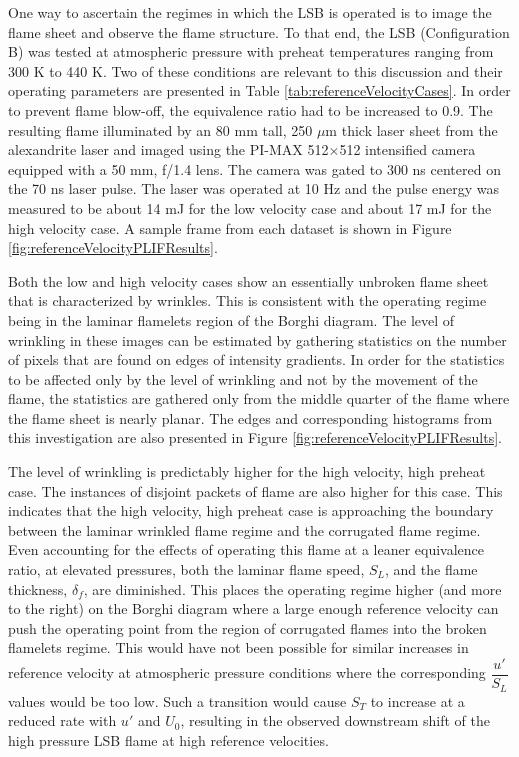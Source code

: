One way to ascertain the regimes in which the LSB is operated is to image the flame sheet and observe the flame structure.
To that end, the LSB (Configuration B) was tested at atmospheric pressure with preheat temperatures ranging from 300 K to 440 K.
Two of these conditions are relevant to this discussion and their operating parameters are presented in Table \ref{tab:referenceVelocityCases}.
In order to prevent flame blow-off, the equivalence ratio had to be increased to 0.9.
The resulting flame illuminated by an 80 mm tall, 250 \(\mu\)m thick laser sheet from the alexandrite laser and imaged using the PI-MAX 512\(\times\)512 intensified camera equipped with a 50 mm, f/1.4 lens.
The camera was gated to 300 ns centered on the 70 ns laser pulse.
The laser was operated at 10 Hz and the pulse energy was measured to be about 14 mJ for the low velocity case and about 17 mJ for the high velocity case.
A sample frame from each dataset is shown in Figure \ref{fig:referenceVelocityPLIFResults}. 

Both the low and high velocity cases show an essentially unbroken flame sheet that is characterized by wrinkles.
This is consistent with the operating regime being in the laminar flamelets region of the Borghi diagram.
The level of wrinkling in these images can be estimated by gathering statistics on the number of pixels that are found on edges of intensity gradients.
In order for the statistics to be affected only by the level of wrinkling and not by the movement of the flame, the statistics are gathered only from the middle quarter of the flame where the flame sheet is nearly planar.
The edges and corresponding histograms from this investigation are also presented in Figure \ref{fig:referenceVelocityPLIFResults}.

The level of wrinkling is predictably higher for the high velocity, high preheat case.
The instances of disjoint packets of flame are also higher for this case.
This indicates that the high velocity, high preheat case is approaching the boundary between the laminar wrinkled flame regime and the corrugated flame regime.
Even accounting for the effects of operating this flame at a leaner equivalence ratio, at elevated pressures, both the laminar flame speed, \(S_L\), and the flame thickness, \(\delta_f\), are diminished.
This places the operating regime higher (and more to the right) on the Borghi diagram where a large enough reference velocity can push the operating point from the region of corrugated flames into the broken flamelets regime.
This would have not been possible for similar increases in reference velocity at atmospheric pressure conditions where the corresponding \(\dfrac{ u' }{ S_L }\) values would be too low.
Such a transition would cause \(S_T\) to increase at a reduced rate with \(u'\) and \(U_0\), resulting in the observed downstream shift of the high pressure LSB flame at high reference velocities.


